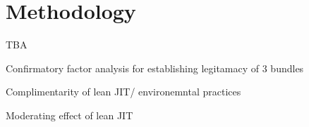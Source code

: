 \section{Methodology}
TBA  

Confirmatory factor analysis for establishing legitamacy of 3 bundles

Complimentarity of lean JIT/ environemntal practices

Moderating effect of lean JIT 





